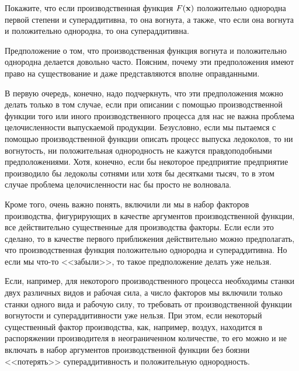 \begin{exer} \label{superadd}
    Покажите, что если производственная функция $F(\mathbf{x})$ положительно однородна
     первой степени и супераддитивна, то она вогнута, а также, что
     если она вогнута и положительно однородна, то она
     супераддитивна.
\end{exer}

    Предположение о том, что производственная функция вогнута и
    положительно однородна делается довольно часто. Поясним, почему
    эти предположения имеют право на существование и даже
    представляются вполне оправданными.

    В первую очередь, конечно, надо подчеркнуть, что эти
    предположения можно делать только в том случае, если при описании с
    помощью производственной функции того или иного
    производственного процесса для нас не важна проблема
    целочисленности выпускаемой продукции. Безусловно, если мы
    пытаемся с помощью производственной функции описать процесс
    выпуска ледоколов, то ни вогнутость, ни положительная
    однородность не кажутся правдоподобными предположениями.
    Хотя, конечно, если бы некоторое предприятие предприятие
    производило бы ледоколы сотнями или хотя бы десятками тысяч, то
    в этом случае проблема целочисленности нас бы просто не волновала.


    Кроме того, очень важно понять, включили ли мы в набор факторов
    производства, фигурирующих в качестве аргументов производственной функции,
     все действительно существенные для производства факторы. Если
    если это сделано, то в качестве первого приближения действительно можно
    предполагать, что производственная функция положительно
    однородна и супераддитивна. Но если мы что-то <<забыли>>, то
    такое предположение делать уже нельзя.


    Если, например, для некоторого производственного процесса необходимы
    станки двух различных видов и рабочая сила, а число факторов мы включили только
    станки одного вида и рабочую силу, то требовать от
    производственной функции вогнутости и супераддитивности уже
    нельзя. При этом, если некоторый существенный фактор
    производства, как, например, воздух, находится в распоряжении производителя в
    неограниченном количестве, то его можно и не включать
    в набор аргументов производственной функции без боязни <<потерять>>
    супераддитивность и положительную однородность.


